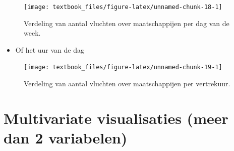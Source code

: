 \documentclass[]{tufte-book}
\providecommand{\tightlist}{%
  \setlength{\itemsep}{0pt}\setlength{\parskip}{0pt}}
\begin{document}
\begin{figure}
\texttt{[image: textbook\_files/figure-latex/unnamed-chunk-18-1]} \caption[Verdeling van aantal vluchten over maatschappijen per dag van de week]{Verdeling van aantal vluchten over maatschappijen per dag van de week.}\label{fig:unnamed-chunk-18}
\end{figure}

\begin{itemize}
\tightlist
\item
  Of het uur van de dag
\end{itemize}

\begin{figure}
\texttt{[image: textbook\_files/figure-latex/unnamed-chunk-19-1]} \caption[Verdeling van aantal vluchten over maatschappijen per vertrekuur]{Verdeling van aantal vluchten over maatschappijen per vertrekuur.}\label{fig:unnamed-chunk-19}
\end{figure}

\hypertarget{multivariate-visualisaties-meer-dan-2-variabelen}{%
\section{Multivariate visualisaties (meer dan 2 variabelen)}\label{multivariate-visualisaties-meer-dan-2-variabelen}}
\end{document}
